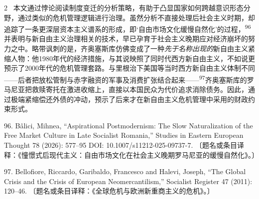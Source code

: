 \documentclass[10pt,a4paper]{article}
\begin{document}
\begin{paracol}{2}
\switchcolumn*
{\scriptsize\color{gray} [p. 26]}\ 本文通过悖论阅读制度变迁的分析策略，有助于凸显国家如何跨越意识形态分野，通过类似的危机管理逻辑进行治理。虽然分析不直接处理后社会主义时期，却追踪了一条更深层资本主义谱系的形成，即‘自由市场文化缓慢自然化’的过程，\nobreak\textsuperscript{96}并表明与新自由主义治理相关的技术，早已孕育于社会主义晚期应对经济崩坏的努力之中。略带讽刺的是，齐奥塞斯库仿佛变成了一种\textit{先于名称出现的}新自由主义紧缩人物：他1980年代的经济措施，与其说映照了同时代西方新自由主义，不如说更预示了2000年代的危机管理套路。与里根治下美国等当时西方新自由主义体制不同——后者把放松管制与赤字融资的军事及消费扩张结合起来——\nobreak\textsuperscript{97}齐奥塞斯库的罗马尼亚把救赎寄托在激进收缩上，直接以本国民众为代价追求消除债务。因此，通过极端紧缩偿还外债的冲动，预示了后来才在新自由主义危机管理中采用的财政约束形式。\par{\small 96. Bâlici, Mihnea, “Aspirational Postmodernism: The Slow Naturalization of the Free Market Culture in Late Socialist Romania,” Studies in Eastern European Thought 78 (2026): 577–95 DOI: 10.1007/s11212-025-09737-7. 〔题名或条目译释：《憧憬式后现代主义：自由市场文化在社会主义晚期罗马尼亚的缓慢自然化》。〕\par}{\small 97. Bellofiore, Riccardo, Garibaldo, Francesco and Halevi, Joseph, “The Global Crisis and the Crisis of European Neomercantilism,” Socialist Register 47 (2011): 120–46. 〔题名或条目译释：《全球危机与欧洲新重商主义的危机》。〕\par}
\switchcolumn

\end{paracol}
\end{document}
